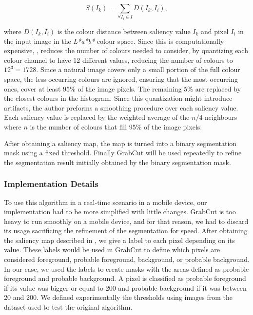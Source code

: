 \begin{equation}
S(I_{k}) = \sum_{\forall I_{i} \in I} D(I_{k}, I_{i}),
\end{equation}

where $D(I_{k}, I_{i})$ is the colour distance between saliency value $I_{k}$ and pixel $I_{i}$ in the input image in the \emph{L*a*b*} colour space. Since this is computationally expensive, \citeauthor{cheng2011global}, reduces the number of colours needed to consider, by quantizing each colour channel to have 12 different values, reducing the number of colours to $12^{3} = 1728$. Since a natural image covers only a small portion of the full colour space, the less occurring colours are ignored, ensuring that the most occurring ones, cover at least 95\% of the image pixels. The remaining 5\% are replaced by the closest colours in the histogram. Since this quantization might introduce artifacts, the author preforms a smoothing procedure over each saliency value. Each saliency value is replaced by the weighted average of the $n/4$ neighbours where $n$ is the number of colours that fill 95\% of the image pixels.

After obtaining a saliency map, the map is turned into a binary segmentation mask using a fixed threshold. Finally GrabCut \cite{rother2004grabcut} will be used repeatedly to refine the segmentation result initially obtained by the binary segmentation mask.

\subsubsection{Implementation Details}

To use this algorithm in a real-time scenario in a mobile device, our implementation had to be more simplified with little changes. GrabCut is too heavy to run smoothly on a mobile device, and for that reason, we had to discard its usage sacrificing the refinement of the segmentation for speed. After obtaining the saliency map described in \cite{cheng2011global}, we give a label to each pixel depending on its value. These labels would be used in GrabCut to define which pixels are considered foreground, probable foreground, background, or probable background. In our case, we used the labels to create masks with the areas defined as probable foreground and probable background. A pixel is classified as probable foreground if its value was bigger or equal to 200 and probable background if it was between 20 and 200. We defined experimentally the thresholds using images from the dataset used to test the original algorithm.

